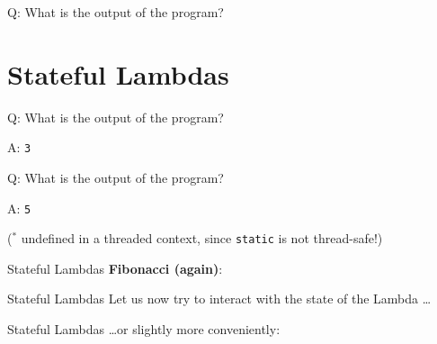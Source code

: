 \begin{frame}[fragile]{Q: What is the output of the program?}

\end{frame}

\begin{frame}
    \centering
    \scalebox{3}{Stateful Lambdas}
\end{frame}

\section{Stateful Lambdas}

\begin{frame}[fragile]{Q: What is the output of the program?}
\end{frame}

\begin{frame}[fragile]{A: \texttt{3}}
\end{frame}

\begin{frame}[fragile]{Q: What is the output of the program?}
\end{frame}

\begin{frame}[fragile]{A: \texttt{5}}

    \begin{center}
        ($^*$ undefined in a threaded context, since \texttt{static} is not thread-safe!)
    \end{center}
\end{frame}

\begin{frame}[fragile]{Stateful Lambdas}
    \textbf{Fibonacci (again)}:
\end{frame}

\begin{frame}[fragile]{Stateful Lambdas}
    Let us now try to interact with the state of the Lambda \ldots
\end{frame}

\begin{frame}[fragile]{Stateful Lambdas}
    \ldots or slightly more conveniently:
\end{frame}

